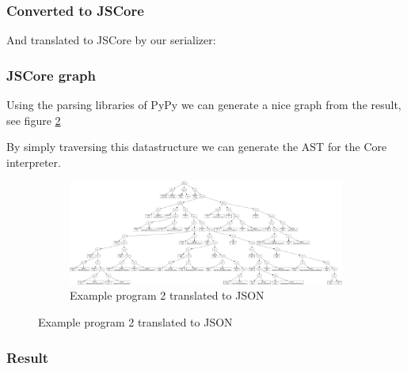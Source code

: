 
\subsubsection{Converted to JSCore}

And translated to JSCore by our serializer:

\begin{footnotesize}

\end{footnotesize}

\subsubsection{JSCore graph}

Using the parsing libraries of PyPy we can generate a nice graph from the result, 
see figure \ref{fig:fibgraph}

By simply traversing this datastructure we can generate the AST for the Core interpreter.

\begin{figure}
\begin{figure}[H]
\includegraphics[width=\textwidth]{../interpreter/tests/fib.png}
\caption{Example program 2 translated to JSON}
\label{fig:fibgraph}
\end{figure}
\end{figure}

\subsubsection{Result}
